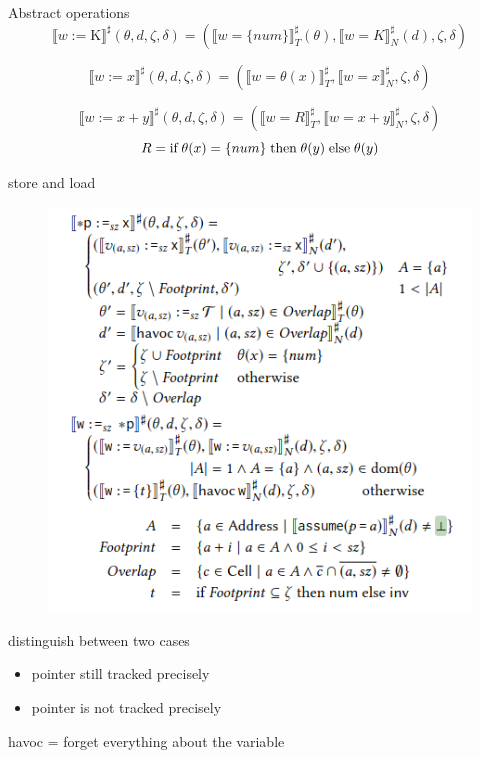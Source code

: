 \documentclass[aspectratio=169]{beamer}
\begin{document}
\begin{frame}{Abstract operations}
 $$
\llbracket w := \mathrm{K} \rrbracket^{\sharp}(\theta, d, \zeta, \delta)= (\llbracket w= \{num\} \rrbracket_{T}^{\sharp}(\theta),\llbracket w=K \rrbracket_{N}^{\sharp}(d),\zeta,\delta)
$$

$$
\llbracket w := x \rrbracket^{\sharp}(\theta, d, \zeta, \delta)= (\llbracket w= \theta(x) \rrbracket_{T}^{\sharp},\llbracket w=x \rrbracket_{N}^{\sharp},\zeta,\delta)
$$

$$
\llbracket w := x + y \rrbracket^{\sharp}(\theta, d, \zeta, \delta) = (\llbracket w=R \rrbracket^{\sharp}_{T},\llbracket w=x+y \rrbracket_{N}^{\sharp},\zeta,\delta)
$$
$$ R= \text{if} \thickspace \theta(x) = { \{num \}} \thickspace \text{then} \thickspace \theta(y) \thickspace \text{else} \thickspace \theta(y)$$
\end{frame}


\begin{frame}{store and load}
  \noindent
  \begin{minipage}{0.55\textwidth}
    \begin{figure}
      \centering
      \includegraphics[width=\textwidth]{loadstore.png}
    \end{figure}
  \end{minipage}
  \begin{minipage}{0.40\textwidth}
  distinguish between two cases
  \begin{itemize}
    \item pointer still tracked precisely
    \item pointer is not tracked precisely
  \end{itemize}
  havoc = forget everything about the variable

  \end{minipage}
\end{frame}
\end{document}
